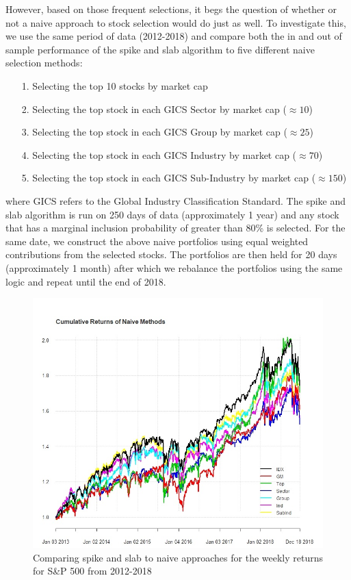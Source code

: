 \documentclass[a4paper, 12pt]{article}
\theoremstyle{plain}
\theoremstyle{definition}
\theoremstyle{remark}
\begin{document}
However, based on those frequent selections, it begs the question of whether or not a naive approach to stock selection would do just as well. To investigate this, we use the same period of data (2012-2018) and compare both the in and out of sample performance of the spike and slab algorithm to five different naive selection methods:
\begin{itemize}
	\itemsep=0em
	\item[1.] Selecting the top 10 stocks by market cap
	\item[2.] Selecting the top stock in each GICS Sector by market cap ($\approx 10$)
	\item[3.] Selecting the top stock in each GICS Group by market cap ($\approx 25$)
	\item[4.] Selecting the top stock in each GICS Industry by market cap ($\approx 70$)
	\item[5.] Selecting the top stock in each GICS Sub-Industry by market cap ($\approx 150$)
\end{itemize}
where GICS refers to the Global Industry Classification Standard. The spike and slab algorithm is run on 250 days of data (approximately 1 year) and any stock that has a marginal inclusion probability of greater than 80\% is selected. For the same date, we construct the above naive portfolios using equal weighted contributions from the selected stocks. The portfolios are then held for 20 days (approximately 1 month) after which we rebalance the portfolios using the same logic and repeat until the end of 2018.

\begin{figure}[H]
\centering
\includegraphics[width=15cm]{out-of-sample}
\caption{Comparing spike and slab to naive approaches for the weekly returns for S\&P 500 from 2012-2018}
\end{figure}
\end{document}
